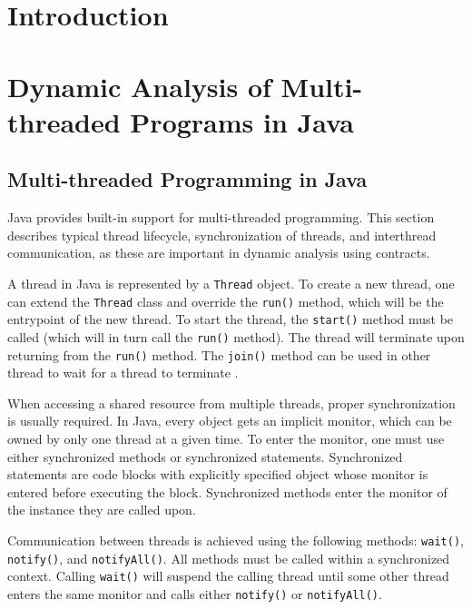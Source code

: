 \chapter{Introduction}

\todo{}



\chapter{Dynamic Analysis of Multi-threaded Programs in Java}



\section{Multi-threaded Programming in Java}

Java provides built-in support for multi-threaded programming. This section
describes typical thread lifecycle, synchronization of threads, and interthread
communication, as these are important in dynamic analysis using contracts.

A thread in Java is represented by a \texttt{Thread} object. To create a new
thread, one can extend the \texttt{Thread} class and override the \texttt{run()}
method, which will be the entrypoint of the new thread. To start the thread,
the \texttt{start()} method must be called (which will in turn call the
\texttt{run()} method). The thread will terminate upon returning from the
\texttt{run()} method. The \texttt{join()} method can be used in other thread to
wait for a thread to terminate \cite{javaTheCompleteReference}.

When accessing a shared resource from multiple threads, proper synchronization
is usually required. In Java, every object gets an implicit monitor, which can
be owned by only one thread at a given time. To enter the monitor, one must use
either synchronized methods or synchronized statements. Synchronized statements
are code blocks with explicitly specified object whose monitor is entered before
executing the block. Synchronized methods enter the monitor of the instance they
are called upon. 

Communication between threads is achieved using the following methods:
\texttt{wait()}, \texttt{notify()}, and \texttt{notifyAll()}. All methods must
be called within a synchronized context. Calling \texttt{wait()} will suspend
the calling thread until some other thread enters the same monitor and calls
either \texttt{notify()} or \texttt{notifyAll()}.

